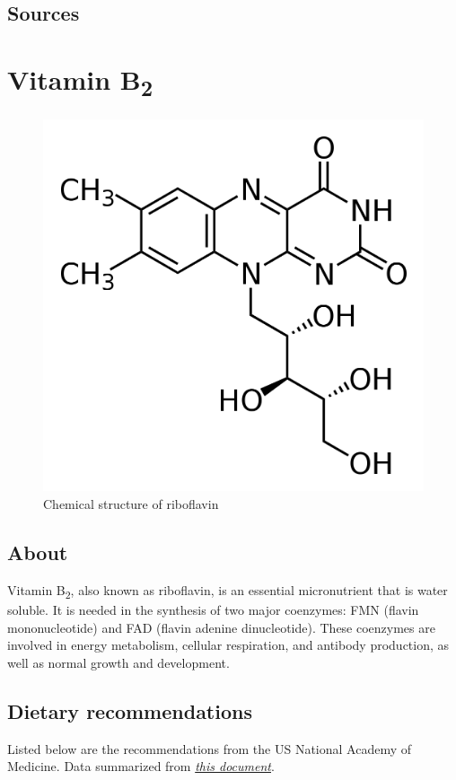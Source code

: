 \documentclass{book}
\begin{document}
\begin{sloppypar}
\section{Sources}


\chapter{Vitamin B\texorpdfstring{\textsubscript{2}}{2}}
\begin{figure}[h]
	\caption{Chemical structure of riboflavin}
	\centering \includegraphics[width=\textwidth]{images/Vitamin_B2_chemical_structure}
\end{figure}
\newpage

\section{About}
Vitamin B\textsubscript{2}, also known as riboflavin, is an essential micronutrient that is water soluble. It is needed in the synthesis of two major coenzymes: FMN (flavin mononucleotide) and FAD (flavin adenine dinucleotide). These coenzymes are involved in energy metabolism, cellular respiration, and antibody production, as well as normal growth and development.

\section{Dietary recommendations}
Listed below are the recommendations from the US National Academy of Medicine. Data summarized from \href{https://nap.nationalacademies.org/read/6015/chapter/7}{\textit{this document}}.


\end{sloppypar}
\end{document}
